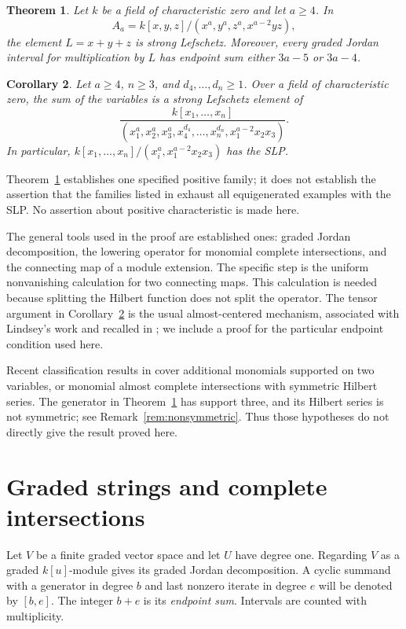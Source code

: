 \documentclass[11pt]{amsart}
\newtheorem{theorem}{Theorem}[section]
\newtheorem{corollary}[theorem]{Corollary}
\theoremstyle{definition}
\begin{document}
\begin{theorem}\label{thm:main}
Let $k$ be a field of characteristic zero and let $a\ge4$. In
\[
 A_a=k[x,y,z]/(x^a,y^a,z^a,x^{a-2}yz),
\]
the element $L=x+y+z$ is strong Lefschetz. Moreover, every graded Jordan
interval for multiplication by $L$ has endpoint sum either $3a-5$ or
$3a-4$.
\end{theorem}

\begin{corollary}\label{cor:extra}
Let $a\ge4$, $n\ge3$, and $d_4,\ldots,d_n\ge1$. Over a field of
characteristic zero, the sum of the variables is a strong Lefschetz
element of
\[
 \frac{k[x_1,\ldots,x_n]}
 {(x_1^a,x_2^a,x_3^a,x_4^{d_4},\ldots,x_n^{d_n},x_1^{a-2}x_2x_3)}.
\]
In particular, $k[x_1,\ldots,x_n]/(x_i^a,x_1^{a-2}x_2x_3)$ has the SLP.
\end{corollary}

Theorem~\ref{thm:main} establishes one specified positive family; it does
not establish the assertion that the families listed in
\cite[Conjecture~1]{GLN2022} exhaust all equigenerated examples with the
SLP. No assertion about positive characteristic is made here.

The general tools used in the proof are established ones: graded Jordan
decomposition, the lowering operator for monomial complete intersections,
and the connecting map of a module extension. The specific step is the
uniform nonvanishing calculation for two connecting maps. This calculation
is needed because splitting the Hilbert function does not split the
operator. The tensor argument in Corollary~\ref{cor:extra} is the usual
almost-centered mechanism, associated with Lindsey's work and recalled in
\cite[Theorem~2.5]{CJK2026}; we include a proof for the particular endpoint
condition used here.

Recent classification results in \cite{CJK2026} cover additional monomials
supported on two variables, or monomial almost complete intersections with
symmetric Hilbert series. The generator in Theorem~\ref{thm:main} has
support three, and its Hilbert series is not symmetric; see
Remark~\ref{rem:nonsymmetric}. Thus those hypotheses do not directly
give the result proved here.

\section{Graded strings and complete intersections}

Let $V$ be a finite graded vector space and let $U$ have degree one.
Regarding $V$ as a graded $k[u]$-module gives its graded Jordan
decomposition. A cyclic summand with a generator in degree $b$ and last
nonzero iterate in degree $e$ will be denoted by $[b,e]$. The integer
$b+e$ is its \emph{endpoint sum}. Intervals are counted with multiplicity.
\end{document}
